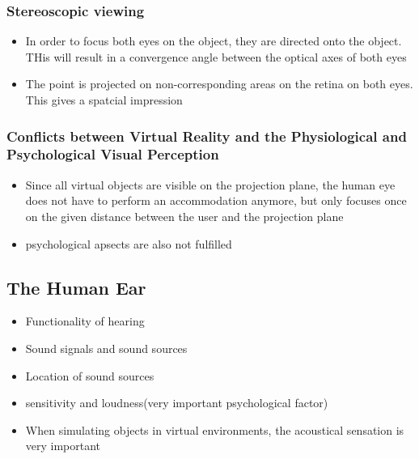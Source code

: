 \documentclass{standalone}
\begin{document}
\subsubsection*{Stereoscopic viewing}
\begin{itemize}
	\item In order to focus both eyes on the object, they are directed onto the object. THis will result in a convergence angle between the optical axes of both eyes	
	\item The point is projected on non-corresponding areas on the retina on both eyes. This gives a spatcial impression
\end{itemize}
\subsubsection{Conflicts between Virtual Reality and the Physiological and Psychological Visual Perception}
\begin{itemize}
	\item Since all virtual objects are visible on the projection plane, the human eye does not have to perform an accommodation anymore, but only focuses once on the given distance between the user and the projection plane
	\item psychological apsects are also not fulfilled
\end{itemize}
\subsection{The Human Ear}
\begin{itemize}
	\item Functionality of hearing
	\item Sound signals and sound sources
	\item Location of sound sources
	\item sensitivity and loudness(very important psychological factor)
	\item When simulating objects in virtual environments, the acoustical sensation is very important
\end{itemize}
\end{document}
